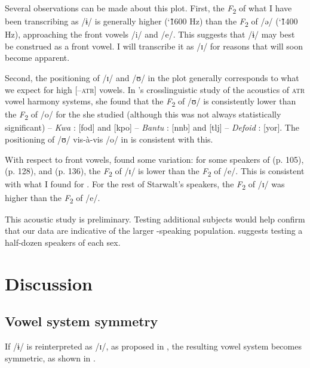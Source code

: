 \documentclass[output=paper,colorlinks,citecolor=brown]{langscibook}
\begin{document}
Several observations can be made about this plot. First, the \textit{F}\textsubscript{2} of what I have been transcribing as /ɨ/ is generally higher (\char`\~1600 Hz) than the \textit{F}\textsubscript{2} of /ə/ (\char`\~1400 Hz), approaching the front vowels /i/ and /e/. This suggests that /ɨ/ may best be construed as a front vowel. I will transcribe it as /ɪ/ for reasons that will soon become apparent.

Second, the positioning of /ɪ/ and /ʊ/ in the plot generally corresponds to what we expect for high [–\textsc{atr}] vowels. In \citet{Starwalt2008}’s crosslinguistic study of the acoustics of \textsc{atr} vowel harmony  systems, she found that the \textit{F}\textsubscript{2} of /ʊ/ is consistently lower than the \textit{F}\textsubscript{2} of /o/ for the  she studied (although this was not always statistically significant) -- \textit{Kwa} :  [fod] and  [kpo] -- \textit{Bantu} :  [nnb] and  [tlj] -- \textit{Defoid} :  [yor]. The positioning of /ʊ/ vis-à-vis /o/ in  is consistent with this.

With respect to front vowels, \citeauthor{Starwalt2008} found some variation: for some speakers of  (p. 105),  (p. 128), and  (p. 136), the \textit{F}\textsubscript{2} of /ɪ/ is lower than the \textit{F}\textsubscript{2} of /e/. This is consistent with what I found for . For the rest of Starwalt’s speakers, the \textit{F}\textsubscript{2} of /ɪ/ was higher than the \textit{F}\textsubscript{2} of /e/.

This acoustic study  is preliminary. Testing additional subjects would help confirm that our data are indicative of the larger -speaking population. \citet{Ladefoged2003} suggests testing a half-dozen speakers of each sex.

\section{Discussion}\label{sec:olson:4}

\subsection{Vowel system symmetry}

If /ɨ/ is reinterpreted as /ɪ/, as proposed in , the resulting  vowel system  becomes  symmetric, as shown in .
\end{document}
